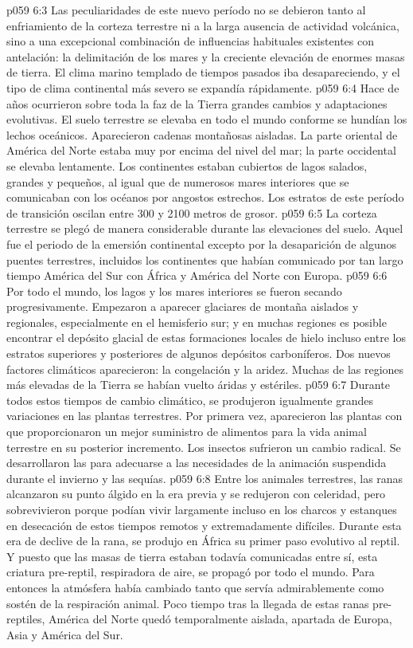 \vs p059 6:3 Las peculiaridades de este nuevo período no se debieron tanto al enfriamiento de la corteza terrestre ni a la larga ausencia de actividad volcánica, sino a una excepcional combinación de influencias habituales existentes con antelación: la delimitación de los mares y la creciente elevación de enormes masas de tierra. El clima marino templado de tiempos pasados iba desapareciendo, y el tipo de clima continental más severo se expandía rápidamente.
\vs p059 6:4 \pc Hace  de años ocurrieron sobre toda la faz de la Tierra grandes cambios y adaptaciones evolutivas. El suelo terrestre se elevaba en todo el mundo conforme se hundían los lechos oceánicos. Aparecieron cadenas montañosas aisladas. La parte oriental de América del Norte estaba muy por encima del nivel del mar; la parte occidental se elevaba lentamente. Los continentes estaban cubiertos de lagos salados, grandes y pequeños, al igual que de numerosos mares interiores que se comunicaban con los océanos por angostos estrechos. Los estratos de este período de transición oscilan entre 300 y 2100 metros de grosor.
\vs p059 6:5 La corteza terrestre se plegó de manera considerable durante las elevaciones del suelo. Aquel fue el periodo de la emersión continental excepto por la desaparición de algunos puentes terrestres, incluidos los continentes que habían comunicado por tan largo tiempo América del Sur con África y América del Norte con Europa.
\vs p059 6:6 Por todo el mundo, los lagos y los mares interiores se fueron secando progresivamente. Empezaron a aparecer glaciares de montaña aislados y regionales, especialmente en el hemisferio sur; y en muchas regiones es posible encontrar el depósito glacial de estas formaciones locales de hielo incluso entre los estratos superiores y posteriores de algunos depósitos carboníferos. Dos nuevos factores climáticos aparecieron: la congelación y la aridez. Muchas de las regiones más elevadas de la Tierra se habían vuelto áridas y estériles.
\vs p059 6:7 \pc Durante todos estos tiempos de cambio climático, se produjeron igualmente grandes variaciones en las plantas terrestres. Por primera vez, aparecieron las plantas con  que proporcionaron un mejor suministro de alimentos para la vida animal terrestre en su posterior incremento. Los insectos sufrieron un cambio radical. Se desarrollaron las  para adecuarse a las necesidades de la animación suspendida durante el invierno y las sequías.
\vs p059 6:8 \pc Entre los animales terrestres, las ranas alcanzaron su punto álgido en la era previa y se redujeron con celeridad, pero sobrevivieron porque podían vivir largamente incluso en los charcos y estanques en desecación de estos tiempos remotos y extremadamente difíciles. Durante esta era de declive de la rana, se produjo en África su primer paso evolutivo al reptil. Y puesto que las masas de tierra estaban todavía comunicadas entre sí, esta criatura pre\hyp{}reptil, respiradora de aire, se propagó por todo el mundo. Para entonces la atmósfera había cambiado tanto que servía admirablemente como sostén de la respiración animal. Poco tiempo tras la llegada de estas ranas pre\hyp{}reptiles, América del Norte quedó temporalmente aislada, apartada de Europa, Asia y América del Sur.
